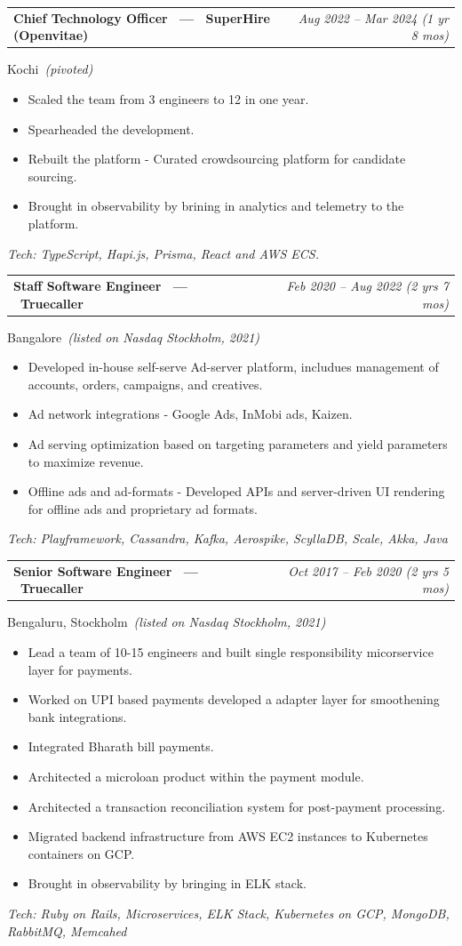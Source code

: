 \documentclass[10.5pt,a4paper]{article}
\makeatletter
\newcommand{\jobheader}[3]{%
  \noindent
  \begin{tabular*}{\textwidth}{@{\extracolsep{\fill}}l r}
    \textbf{\large #1} & {\itshape\color{lightgray} #3} \\
  \end{tabular*}\par
}
\newcommand{\jobentry}[4]{%
  \jobheader{#1 \ --- \ \textbf{#2}}{}{#3}
  {\color{graytext} #4}\par\vspace{2pt}
}
\newcommand{\techline}[1]{%
  {\small\itshape\color{blue} Tech: #1}\par\vspace{6pt}
}
\newcommand{\status}[1]{\ {\normalfont\small\itshape\color{lightgray}(#1)}}
\makeatother
\begin{document}
\jobentry{Chief Technology Officer}{SuperHire (Openvitae)}{Aug 2022 -- Mar 2024 (1 yr 8 mos)}{Kochi\status{pivoted}}
\begin{itemize}[leftmargin=16pt, itemsep=1pt, topsep=2pt, parsep=0pt]
  \item Scaled the team from 3 engineers to 12 in one year.
  \item Spearheaded the development.
  \item Rebuilt the platform - Curated crowdsourcing platform for candidate sourcing.
  \item Brought in observability by brining in analytics and telemetry to the platform.
\end{itemize}
\techline{TypeScript, Hapi.js, Prisma, React and AWS ECS.}

\jobentry{Staff Software Engineer}{Truecaller}{Feb 2020 -- Aug 2022 (2 yrs 7 mos)}{Bangalore\status{listed on Nasdaq Stockholm, 2021}}
\begin{itemize}[leftmargin=16pt, itemsep=1pt, topsep=2pt, parsep=0pt]
  \item Developed in-house self-serve Ad-server platform, includues management of accounts, orders, campaigns, and creatives.
  \item Ad network integrations - Google Ads, InMobi ads, Kaizen.
  \item Ad serving optimization based on targeting parameters and yield parameters to maximize revenue.
  \item Offline ads and ad-formats - Developed APIs and server-driven UI rendering for offline ads and proprietary ad formats.
\end{itemize}
\techline{Playframework, Cassandra, Kafka, Aerospike, ScyllaDB, Scale, Akka, Java}

\jobentry{Senior Software Engineer}{Truecaller}{Oct 2017 -- Feb 2020 (2 yrs 5 mos)}{Bengaluru, Stockholm\status{listed on Nasdaq Stockholm, 2021}}
\begin{itemize}[leftmargin=16pt, itemsep=1pt, topsep=2pt, parsep=0pt]
  \item Lead a team of 10-15 engineers and built single responsibility micorservice layer for payments.
  \item Worked on UPI based payments developed a adapter layer for smoothening bank integrations.
  \item Integrated Bharath bill payments.
  \item Architected a microloan product within the payment module.
  \item Architected a transaction reconciliation system for post-payment processing.
  \item Migrated backend infrastructure from AWS EC2 instances to Kubernetes containers on GCP.
  \item Brought in observability by bringing in ELK stack.
\end{itemize}
\techline{Ruby on Rails, Microservices, ELK Stack, Kubernetes on GCP, MongoDB, RabbitMQ, Memcahed}
\end{document}
